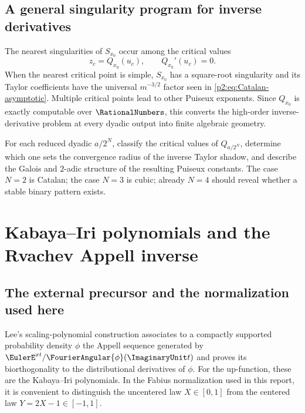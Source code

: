 \documentclass[11pt,oneside]{article}
\numberwithin{equation}{section}
\theoremstyle{definition}
\theoremstyle{remark}
\begin{document}
\subsection{A general singularity program for inverse derivatives}

The nearest singularities of $S_{x_0}$ occur among the critical values
\begin{equation}
 z_c=Q_{x_0}(u_c),
 \qquad Q_{x_0}'(u_c)=0.
 \label{p2:eq:critical-values}
\end{equation}
When the nearest critical point is simple, $S_{x_0}$ has a square-root singularity and its Taylor
coefficients have the universal $m^{-3/2}$ factor seen in \eqref{p2:eq:Catalan-asymptotic}.  Multiple
critical points lead to other Puiseux exponents.  Since $Q_{x_0}$ is exactly computable over $\RationalNumbers$,
this converts the high-order inverse-derivative problem at every dyadic output into finite algebraic
geometry.

\begin{frontierbox}
For each reduced dyadic $a/2^N$, classify the critical values of $Q_{a/2^N}$, determine which one
sets the convergence radius of the inverse Taylor shadow, and describe the Galois and $2$-adic
structure of the resulting Puiseux constants.  The case $N=2$ is Catalan; the case $N=3$ is cubic;
already $N=4$ should reveal whether a stable binary pattern exists.
\end{frontierbox}

\section{Kabaya--Iri polynomials and the Rvachev Appell inverse}
\label{p2:sec:appell}

\subsection{The external precursor and the normalization used here}

Lee's scaling-polynomial construction associates to a compactly supported probability density
$\phi$ the Appell sequence generated by
$\EulerE^{xt}/\FourierAngular{\phi}(\ImaginaryUnit t)$ and proves its biorthogonality
to the distributional derivatives of $\phi$.  For the up-function, these are the Kabaya--Iri
polynomials.  In the Fabius normalization used in this report, it is convenient to distinguish the
uncentered law $X\in[0,1]$ from the centered law $Y=2X-1\in[-1,1]$.
\end{document}
